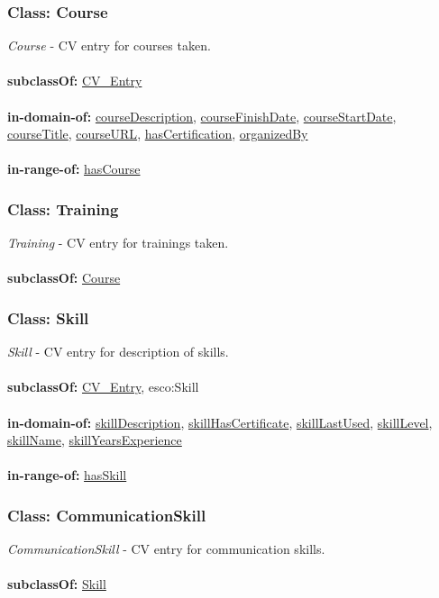 \documentclass[a4paper,12pt]{article}
\numberwithin{equation}{section}
\begin{document}
\subsubsection{Class: Course}\hypertarget{Course}{}
\textit{Course} - CV entry for courses taken.
\\\\
\textbf{subclassOf:} \hyperlink{CV\_Entry}{CV\_Entry}
\\\\
\textbf{in-domain-of:} \hyperlink{courseDescription}{courseDescription}, \hyperlink{courseFinishDate}{courseFinishDate}, \hyperlink{courseStartDate}{courseStartDate}, \hyperlink{courseTitle}{courseTitle}, \hyperlink{courseURL}{courseURL}, \hyperlink{hasCertification}{hasCertification}, \hyperlink{organizedBy}{organizedBy}
\\\\
\textbf{in-range-of:} \hyperlink{hasCourse}{hasCourse}

\subsubsection{Class: Training}\hypertarget{Training}{}
\textit{Training} - CV entry for trainings taken.
\\\\
\textbf{subclassOf:} \hyperlink{Course}{Course}

\subsubsection{Class: Skill}\hypertarget{Skill}{}
\textit{Skill} - CV entry for description of skills.
\\\\
\textbf{subclassOf:} \hyperlink{CV\_Entry}{CV\_Entry}, esco:Skill
\\\\
\textbf{in-domain-of:} \hyperlink{skillDescription}{skillDescription}, \hyperlink{skillHasCertificate}{skillHasCertificate}, \hyperlink{skillLastUsed}{skillLastUsed}, \hyperlink{skillLevel}{skillLevel}, \hyperlink{skillName}{skillName}, \hyperlink{skillYearsExperience}{skillYearsExperience}
\\\\
\textbf{in-range-of:} \hyperlink{hasSkill}{hasSkill}

\subsubsection{Class: CommunicationSkill}\hypertarget{CommunicationSkill}{}
\textit{CommunicationSkill} - CV entry for communication skills.
\\\\
\textbf{subclassOf:} \hyperlink{Skill}{Skill}
\end{document}
